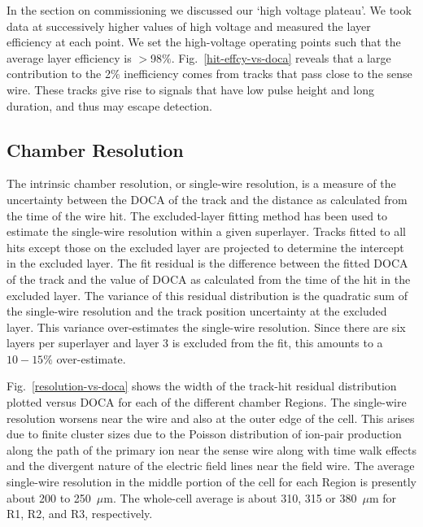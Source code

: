 In the section on commissioning we discussed our `high voltage plateau'.
We took data at successively higher values of high voltage and measured the
layer efficiency at each point.  We set the high-voltage operating points such that
the average layer efficiency is $>$98$\%$. 
Fig.~\ref{hit-effcy-vs-doca} reveals that a large contribution to the 2$\%$ inefficiency comes 
from tracks that pass close to the sense wire.  These tracks give rise to signals 
that have low pulse height and long duration, and thus may escape detection.


\subsection{Chamber Resolution}

\hskip 0.15in
The intrinsic chamber resolution, or single-wire resolution, is a measure
of the uncertainty between the DOCA of the track and the distance as
calculated from the time of the wire hit.  The excluded-layer fitting method 
has been used to estimate the single-wire resolution within a given superlayer.  
Tracks fitted to all hits except those on the excluded layer are projected to 
determine the intercept in the excluded layer.  The fit residual is the difference 
between the fitted DOCA of the track and the value of DOCA as calculated from the 
time of the hit in the excluded layer.  The variance of this residual distribution 
is the quadratic sum of the single-wire resolution and the track position uncertainty 
at the excluded layer.  This variance over-estimates the single-wire resolution.
Since there are six layers per superlayer and layer 3 is excluded from the fit,
this amounts to a $10 - 15\%$ over-estimate.

Fig.~\ref{resolution-vs-doca} shows the width of the track-hit residual distribution plotted versus DOCA for 
each of the different chamber Regions.  The single-wire resolution worsens near the 
wire and also at the outer edge of the cell.  This arises due to finite cluster sizes 
due to the Poisson distribution of ion-pair production along the path of the primary ion 
near the sense wire along with time walk effects and the divergent nature of the electric
field lines near the field wire.  The average single-wire resolution in the middle 
portion of the cell for each Region is presently about 200 to 250~$\mu$m.  The whole-cell 
average is about 310, 315 or 380~$\mu$m for R1, R2, and R3, respectively.

